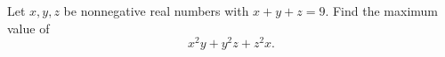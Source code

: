 Let $x,y,z$ be nonnegative real numbers with $x+y+z=9$. Find the maximum value of
\[x^2y+y^2z+z^2x.\]
